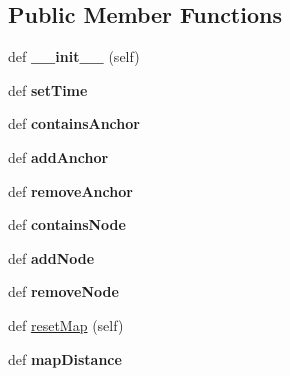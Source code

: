 \subsection*{Public Member Functions}
\begin{DoxyCompactItemize}
\item 
\mbox{\label{classsimlib_1_1hub_1_1_hub_a463e7b39ecb415d2f12789ab38213883}} 
def {\bfseries \+\_\+\+\_\+init\+\_\+\+\_\+} (self)
\item 
\mbox{\label{classsimlib_1_1hub_1_1_hub_aee3b45cd9600d3c35c92bdb4871de586}} 
def {\bfseries set\+Time}
\item 
\mbox{\label{classsimlib_1_1hub_1_1_hub_a32d013c48e8bf89093c30a847ee7f3c7}} 
def {\bfseries contains\+Anchor}
\item 
\mbox{\label{classsimlib_1_1hub_1_1_hub_abdae7847cfc28517804da006cb55ee65}} 
def {\bfseries add\+Anchor}
\item 
\mbox{\label{classsimlib_1_1hub_1_1_hub_abdcb60d6386e88f57ae1f111aae00cf5}} 
def {\bfseries remove\+Anchor}
\item 
\mbox{\label{classsimlib_1_1hub_1_1_hub_a2e1b1b852d6a72f8511a1a66c98f938e}} 
def {\bfseries contains\+Node}
\item 
\mbox{\label{classsimlib_1_1hub_1_1_hub_a91fe6d6f8365496de31b2550129bd27b}} 
def {\bfseries add\+Node}
\item 
\mbox{\label{classsimlib_1_1hub_1_1_hub_a8adca099b501b37519bc755d47b43c35}} 
def {\bfseries remove\+Node}
\item 
def \mbox{\hyperlink{classsimlib_1_1hub_1_1_hub_acce9179de32abdcd091534e2d00b9156}{reset\+Map}} (self)
\item 
\mbox{\label{classsimlib_1_1hub_1_1_hub_a6c7bcdb32a543f23d91f6c9fb5a684d3}} 
def {\bfseries map\+Distance}
\item 
\mbox{\label{classsimlib_1_1hub_1_1_hub_a1f9e992128dff4752b3890c7678cec22}} 

\end{DoxyCompactItemize}
